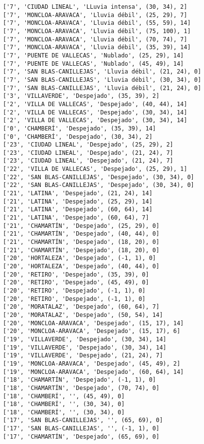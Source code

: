 \documentclass[11pt]{article}
\begin{document}
\begin{Verbatim}[commandchars=\\\{\}]
['7', 'CIUDAD LINEAL', 'LLuvia intensa', (30, 34), 2]
['7', 'MONCLOA-ARAVACA', 'Lluvia débil', (25, 29), 7]
['7', 'MONCLOA-ARAVACA', 'Lluvia débil', (55, 59), 14]
['7', 'MONCLOA-ARAVACA', 'Lluvia débil', (75, 100), 1]
['7', 'MONCLOA-ARAVACA', 'Lluvia débil', (70, 74), 7]
['7', 'MONCLOA-ARAVACA', 'Lluvia débil', (35, 39), 14]
['7', 'PUENTE DE VALLECAS', 'Nublado', (25, 29), 14]
['7', 'PUENTE DE VALLECAS', 'Nublado', (45, 49), 14]
['7', 'SAN BLAS-CANILLEJAS', 'Lluvia débil', (21, 24), 0]
['7', 'SAN BLAS-CANILLEJAS', 'Lluvia débil', (30, 34), 0]
['7', 'SAN BLAS-CANILLEJAS', 'Lluvia débil', (21, 24), 0]
['3', 'VILLAVERDE', 'Despejado', (35, 39), 2]
['2', 'VILLA DE VALLECAS', 'Despejado', (40, 44), 14]
['2', 'VILLA DE VALLECAS', 'Despejado', (30, 34), 14]
['2', 'VILLA DE VALLECAS', 'Despejado', (30, 34), 14]
['0', 'CHAMBERÍ', 'Despejado', (35, 39), 14]
['0', 'CHAMBERÍ', 'Despejado', (30, 34), 2]
['23', 'CIUDAD LINEAL', 'Despejado', (25, 29), 2]
['23', 'CIUDAD LINEAL', 'Despejado', (21, 24), 7]
['23', 'CIUDAD LINEAL', 'Despejado', (21, 24), 7]
['22', 'VILLA DE VALLECAS', 'Despejado', (25, 29), 1]
['22', 'SAN BLAS-CANILLEJAS', 'Despejado', (30, 34), 0]
['22', 'SAN BLAS-CANILLEJAS', 'Despejado', (30, 34), 0]
['21', 'LATINA', 'Despejado', (21, 24), 14]
['21', 'LATINA', 'Despejado', (25, 29), 14]
['21', 'LATINA', 'Despejado', (60, 64), 14]
['21', 'LATINA', 'Despejado', (60, 64), 7]
['21', 'CHAMARTÍN', 'Despejado', (25, 29), 0]
['21', 'CHAMARTÍN', 'Despejado', (40, 44), 0]
['21', 'CHAMARTÍN', 'Despejado', (18, 20), 0]
['21', 'CHAMARTÍN', 'Despejado', (18, 20), 0]
['20', 'HORTALEZA', 'Despejado', (-1, 1), 0]
['20', 'HORTALEZA', 'Despejado', (40, 44), 0]
['20', 'RETIRO', 'Despejado', (35, 39), 0]
['20', 'RETIRO', 'Despejado', (45, 49), 0]
['20', 'RETIRO', 'Despejado', (-1, 1), 0]
['20', 'RETIRO', 'Despejado', (-1, 1), 0]
['20', 'MORATALAZ', 'Despejado', (60, 64), 7]
['20', 'MORATALAZ', 'Despejado', (50, 54), 14]
['20', 'MONCLOA-ARAVACA', 'Despejado', (15, 17), 14]
['20', 'MONCLOA-ARAVACA', 'Despejado', (15, 17), 6]
['19', 'VILLAVERDE', 'Despejado', (30, 34), 14]
['19', 'VILLAVERDE', 'Despejado', (30, 34), 14]
['19', 'VILLAVERDE', 'Despejado', (21, 24), 7]
['19', 'MONCLOA-ARAVACA', 'Despejado', (45, 49), 2]
['19', 'MONCLOA-ARAVACA', 'Despejado', (60, 64), 14]
['18', 'CHAMARTÍN', 'Despejado', (-1, 1), 0]
['18', 'CHAMARTÍN', 'Despejado', (70, 74), 0]
['18', 'CHAMBERÍ', '', (45, 49), 0]
['18', 'CHAMBERÍ', '', (30, 34), 0]
['18', 'CHAMBERÍ', '', (30, 34), 0]
['17', 'SAN BLAS-CANILLEJAS', '', (65, 69), 0]
['17', 'SAN BLAS-CANILLEJAS', '', (-1, 1), 0]
['17', 'CHAMARTÍN', 'Despejado', (65, 69), 0]

\end{Verbatim}
\end{document}
